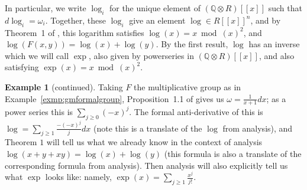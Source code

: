 \documentclass[12pt]{article}
\newcommand{\Q}{\mathbb{Q}}
\newcommand{\tensor}{\otimes}
\theoremstyle{plain}
\theoremstyle{definition}
\newtheorem{exmp}[thm]{Example} %
\theoremstyle{remark}
\begin{document}
In particular, we write $\log_i$ for the unique element of $(\Q\tensor R)[[x]]$ such that $d\log_i = \omega_i$. Together, these $\log_i$ give an element $\log \in R[[x]]^n$, and by Theorem~1 of \citep{honda70}, this logarithm satisfies $\log(x) = x \bmod (x)^2$, and $\log(F(x,y)) = \log(x)+\log(y)$. By the first result, $\log$ has an inverse which we will call $\exp$, also given by powerseries in $(\Q\tensor R)[[x]]$, and also satisfying $\exp(x) = x \bmod (x)^2$.
\addtocounter{thm}{-1}
\begin{exmp}[continued]
Taking $F$ the multiplicative group as in Example~\ref{exmp:gmformalgroup}, Proposition~1.1 of \citep{honda70} gives us $\omega = \frac{1}{x+1}dx$; as a power series this is $\sum_{j \geq 0} (-x)^j$. The formal anti-derivative of this is $\log = \sum_{j \geq 1} \frac{-(-x)^j}{j}dx$ (note this is a translate of the $\log$ from analysis), and Theorem $1$ will tell us what we already know in the context of analysis $\log(x + y + xy) = \log(x)+\log(y)$ (this formula is also a translate of the corresponding formula from analysis). Then analysis will also explicitly tell us what $\exp$ looks like: namely, $\exp(x) = \sum_{j \geq 1} \frac{x^j}{j!}$.
\end{exmp}
\addtocounter{thm}{2}
\end{document}
